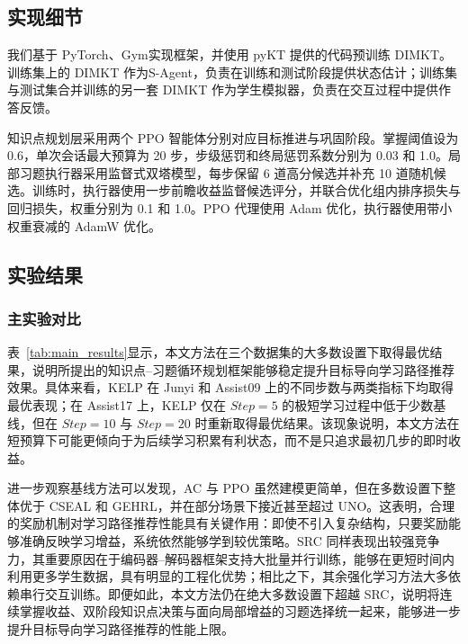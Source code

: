 \documentclass[UTF8,a4paper,zihao=5,twocolumn]{ctexart}
\begin{document}
\subsection{实现细节}
我们基于 PyTorch\cite{PasGM2019}、Gym\cite{BroCP2016}实现框架，并使用 pyKT 提供的代码预训练 DIMKT\cite{SheHL2022}。训练集上的 DIMKT 作为S-Agent，负责在训练和测试阶段提供状态估计；训练集与测试集合并训练的另一套 DIMKT 作为学生模拟器，负责在交互过程中提供作答反馈。

知识点规划层采用两个 PPO 智能体分别对应目标推进与巩固阶段。掌握阈值设为 0.6，单次会话最大预算为 20 步，步级惩罚和终局惩罚系数分别为 0.03 和 1.0。局部习题执行器采用监督式双塔模型，每步保留 6 道高分候选并补充 10 道随机候选。训练时，执行器使用一步前瞻收益监督候选评分，并联合优化组内排序损失与回归损失，权重分别为 0.1 和 1.0。PPO 代理使用 Adam\cite{KinB2015} 优化，执行器使用带小权重衰减的 AdamW\cite{LosH2019} 优化。

\subsection{实验结果}
\subsubsection{主实验对比}
表~\ref{tab:main_results}显示，本文方法在三个数据集的大多数设置下取得最优结果，说明所提出的知识点--习题循环规划框架能够稳定提升目标导向学习路径推荐效果。具体来看，KELP 在 Junyi 和 Assist09 上的不同步数与两类指标下均取得最优表现；在 Assist17 上，KELP 仅在 $Step=5$ 的极短学习过程中低于少数基线，但在 $Step=10$ 与 $Step=20$ 时重新取得最优结果。该现象说明，本文方法在短预算下可能更倾向于为后续学习积累有利状态，而不是只追求最初几步的即时收益。

进一步观察基线方法可以发现，AC 与 PPO 虽然建模更简单，但在多数设置下整体优于 CSEAL 和 GEHRL，并在部分场景下接近甚至超过 UNO。这表明，合理的奖励机制对学习路径推荐性能具有关键作用：即使不引入复杂结构，只要奖励能够准确反映学习增益，系统依然能够学到较优策略。SRC 同样表现出较强竞争力，其重要原因在于编码器--解码器框架支持大批量并行训练，能够在更短时间内利用更多学生数据，具有明显的工程化优势；相比之下，其余强化学习方法大多依赖串行交互训练。即便如此，本文方法仍在绝大多数设置下超越 SRC，说明将连续掌握收益、双阶段知识点决策与面向局部增益的习题选择统一起来，能够进一步提升目标导向学习路径推荐的性能上限。
\end{document}

